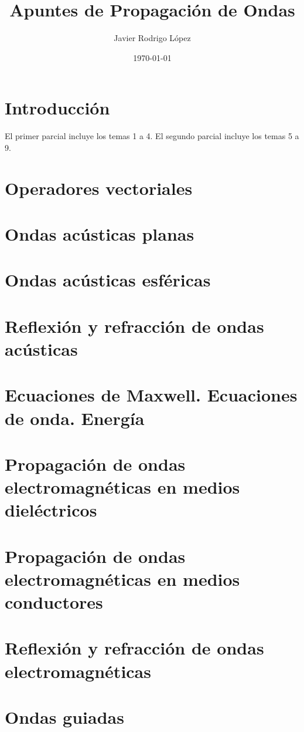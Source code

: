 \documentclass[12pt, a4paper]{article}
\title{Apuntes de Propagación de Ondas}
\author{Javier Rodrigo López}
\date{\today}
\begin{document}
\maketitle

\tableofcontents

\section*{Introducción}

El primer parcial incluye los temas 1 a 4. El segundo parcial incluye los temas 5 a 9.



\section{Operadores vectoriales}
\section{Ondas acústicas planas}
\section{Ondas acústicas esféricas}
\section{Reflexión y refracción de ondas acústicas}
\section{Ecuaciones de Maxwell. Ecuaciones de onda. Energía}
\section{Propagación de ondas electromagnéticas en medios dieléctricos}
\section{Propagación de ondas electromagnéticas en medios conductores}
\section{Reflexión y refracción de ondas electromagnéticas}
\section{Ondas guiadas}
\end{document}
